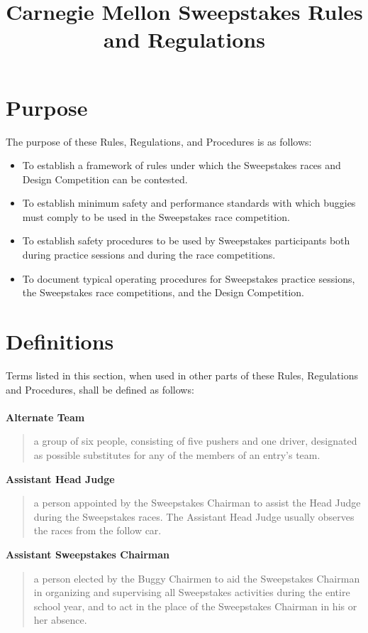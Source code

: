 \documentclass[openany]{book}
\title{Carnegie Mellon Sweepstakes Rules and Regulations}
\author{}
\begin{document}
\maketitle
\tableofcontents
\newpage

\chapter{Purpose}

The purpose of these Rules, Regulations, and Procedures is as follows:
\begin{itemize}
	\item To establish a framework of rules under which the Sweepstakes races and Design Competition can be contested.
	\item To establish minimum safety and performance standards with which buggies must comply to be used in the Sweepstakes race competition.
	\item To establish safety procedures to be used by Sweepstakes participants both during practice sessions and during the race competitions.
	\item To document typical operating procedures for Sweepstakes practice sessions, the Sweepstakes race competitions, and the Design Competition.
\end{itemize}

\chapter{Definitions}

Terms listed in this section, when used in other parts of these Rules, Regulations and Procedures, shall be defined as follows:\\
\\
\textbf{Alternate Team}
\begin{quote}
	a group of six people, consisting of five pushers and one driver, designated as possible substitutes for any of the members of an entry's team.
\end{quote}

\textbf{Assistant Head Judge}
\begin{quote}
	a person appointed by the Sweepstakes Chairman to assist the Head Judge during the Sweepstakes races. The Assistant Head Judge usually observes the races from the follow car.
\end{quote}

\textbf{Assistant Sweepstakes Chairman}
\begin{quote}
	a person elected by the Buggy Chairmen to aid the Sweepstakes Chairman in organizing and supervising all Sweepstakes activities during the entire school year, and to act in the place of the Sweepstakes Chairman in his or her absence.
\end{quote}
\end{document}
